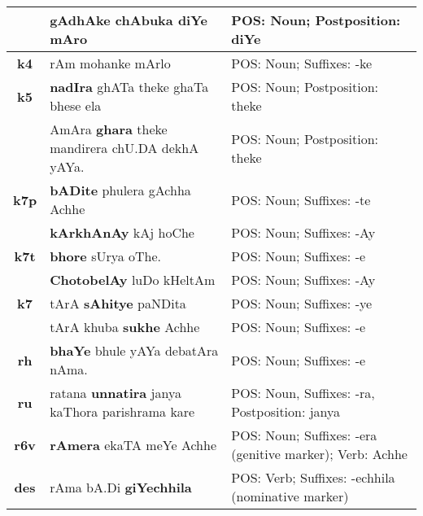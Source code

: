 \documentclass[a4 paper]{article}
\begin{document}
\begin{longtable}{cp{}p{}}
    \addlinespace[0.5em]
                 & gAdhAke \textbf{chAbuka} diYe mAro
                 & POS: Noun; Postposition: diYe\\
    \midrule
    \addlinespace[0.5em]
    \textbf{k4}
                 & rAm mohanke mArlo
                 & POS: Noun; Suffixes: -ke\\
    \midrule
    \addlinespace[0.5em]
    \textbf{k5}
                 & \textbf{nadIra} ghATa theke ghaTa bhese ela
                 & POS: Noun; Postposition: theke\\
    \addlinespace[0.5em]
                 & AmAra \textbf{ghara} theke mandirera chU.DA dekhA yAYa.
                 & POS: Noun; Postposition: theke\\
    \midrule
    \addlinespace[0.5em]
    \textbf{k7p}
                 & \textbf{bADite} phulera gAchha Achhe
                 & POS: Noun; Suffixes: -te\\
    \addlinespace[0.5em]
                 & \textbf{kArkhAnAy} kAj hoChe
                 & POS: Noun; Suffixes: -Ay\\
    \midrule
    \addlinespace[0.5em]
    \textbf{k7t}
                 & \textbf{bhore} sUrya oThe.
                 & POS: Noun; Suffixes: -e\\
    \addlinespace[0.5em]
                 & \textbf{ChotobelAy} luDo kHeltAm
                 & POS: Noun; Suffixes: -Ay\\
    \midrule
    \addlinespace[0.5em]
    \textbf{k7}
                 & tArA \textbf{sAhitye} paNDita
                 & POS: Noun; Suffixes: -ye\\
    \addlinespace[0.5em]
                 & tArA khuba \textbf{sukhe} Achhe
                 & POS: Noun; Suffixes: -e\\
    \midrule
    \addlinespace[0.5em]
    \textbf{rh}
                 & \textbf{bhaYe} bhule yAYa debatAra nAma.
                 & POS: Noun; Suffixes: -e\\
    \midrule
    \addlinespace[0.5em]
    \textbf{ru}
                 & ratana \textbf{unnatira} janya kaThora parishrama kare
                 & POS: Noun, Suffixes: -ra, Postposition: janya\\
    \midrule
    \addlinespace[0.5em]
    \textbf{r6v}
                 & \textbf{rAmera} ekaTA meYe Achhe
                 & POS: Noun; Suffixes: -era (genitive marker); Verb: Achhe\\
    \midrule
    \addlinespace[0.5em]
    \textbf{des}
                 & rAma bA.Di \textbf{giYechhila}
                 & POS: Verb; Suffixes: -echhila (nominative marker)\\

\end{longtable}
\end{document}
